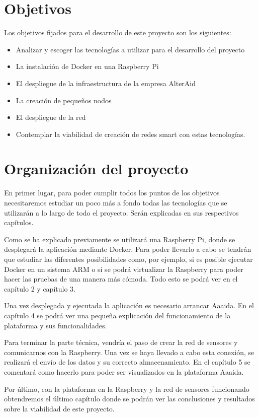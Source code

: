 \section{Objetivos}

Los objetivos fijados para el desarrollo de este proyecto son los siguientes:

\begin{itemize}
\item Analizar y escoger las tecnologías a utilizar para el desarrollo del proyecto
\item La instalación de Docker en una Raspberry Pi
\item El despliegue de la infraestructura de la empresa AlterAid
\item La creación de pequeños nodos
\item El despliegue de la red
\item Contemplar la viabilidad de creación de redes smart con estas tecnologías. 
\end{itemize}
\pagebreak

\section{Organización del proyecto}

En primer lugar, para poder cumplir todos los puntos de los objetivos necesitaremos estudiar un poco más a fondo todas las tecnologías que se utilizarán a lo largo de todo el proyecto. Serán explicadas en sus respectivos capítulos.

Como se ha explicado previamente se utilizará una Raspberry Pi, donde se desplegará la aplicación mediante Docker. Para poder llevarlo a cabo se tendrán que estudiar las diferentes posibilidades como, por ejemplo, si es posible ejecutar Docker en un sistema ARM o si se podrá virtualizar la Raspberry para poder hacer las pruebas de una manera más cómoda. Todo esto se podrá ver en el capítulo 2 y capítulo 3.

Una vez desplegada y ejecutada la aplicación es necesario arrancar Aaaida. En el capítulo 4 se podrá ver una pequeña explicación del funcionamiento de la plataforma y sus funcionalidades. 

Para terminar la parte técnica, vendría el paso de crear la red de sensores y
comunicarnos con la Raspberry. Una vez se haya llevado a cabo esta conexión, se realizará el envío de los datos y su correcto almacenamiento. En el capítulo 5 se comentará como hacerlo para poder ser visualizados en la plataforma Aaaida. 

Por último, con la plataforma en la Raspberry y la red de sensores funcionando obtendremos el último capítulo donde se podrán ver las conclusiones y resultados sobre la viabilidad de este proyecto.
